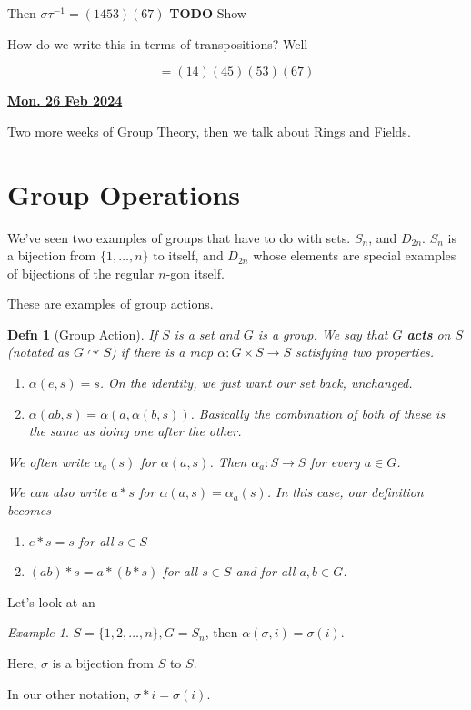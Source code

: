 \documentclass[12pt]{article}
\renewcommand{\date}[1]{\underline{\bf #1}}
\def\acts{\curvearrowright} %
\def\TODO{\color{red}\textbf{TODO}\color{black}}
\newtheorem{definition}{Defn}
\theoremstyle{remark}
\theoremstyle{remark}
\theoremstyle{remark}
\newtheorem{example}{Example}
\theoremstyle{remark}
\theoremstyle{remark}
\begin{document}
Then $\sigma \tau^{-1} = (1453)(67)$ \TODO{} Show

How do we write this in terms of transpositions? Well

\[
  = (14)(45)(53)(67)
\]

\date{Mon. 26 Feb 2024}

Two more weeks of Group Theory, then we talk about Rings and Fields.

\section{Group Operations}

We've seen two examples of groups that have to do with sets. $S_n$, and
$D_{2n}$. $S_n$ is a bijection from $\{1, \dots, n\}$ to itself, and $D_{2n}$
whose elements are special examples of bijections of the regular $n$-gon itself.

These are examples of group actions.

\begin{definition}[Group Action]
  If $S$ is a set and $G$ is a group. We say that $G$ {\bf acts} on $S$ (notated
  as $G \acts S$) if there is a map $\alpha: G \times S \to S$ satisfying two
  properties.

  \begin{enumerate}
    \item $\alpha(e, s) = s$. On the identity, we just want our set back,
      unchanged.

    \item $\alpha(ab, s) = \alpha(a, \alpha(b, s))$. Basically the combination
      of both of these is the same as doing one after the other.
  \end{enumerate}

  We often write $\alpha_a(s)$ for $\alpha(a, s)$. Then $\alpha_a: S \to S$ for
  every $a \in G$.

  We can also write $a * s$ for $\alpha(a, s) = \alpha_a(s)$. In this case, our
  definition becomes

  \begin{enumerate}
    \item $e * s = s$ for all $s \in S$
    \item $(ab) * s = a * (b * s)$ for all $s \in S$ and for all $a, b \in G$.
  \end{enumerate}
\end{definition}

Let's look at an

\begin{example}
  $S = \{1, 2, \dots, n\}, G = S_n$, then $\alpha(\sigma, i) = \sigma(i)$.

  Here, $\sigma$ is a bijection from $S$ to $S$.

  In our other notation, $\sigma * i = \sigma(i)$.
\end{example}
\end{document}
